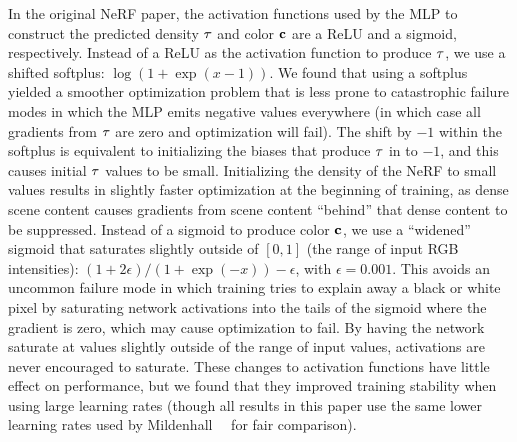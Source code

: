 \documentclass[10pt,twocolumn,letterpaper]{article}
\begin{document}
In the original NeRF paper, the activation functions used by the MLP to construct the predicted density $\tau$ and color $\mathbf{c}$ are a ReLU and a sigmoid, respectively. Instead of a ReLU as the activation function to produce $\tau$, we use a shifted softplus: $\log(1+\exp(x - 1))$. We found that using a softplus yielded a smoother optimization problem that is less prone to catastrophic failure modes in which the MLP emits negative values everywhere (in which case all gradients from $\tau$ are zero and optimization will fail). The shift by $-1$ within the softplus is equivalent to initializing the biases that produce $\tau$ in \shortmodelnamelower to $-1$, and this causes initial $\tau$ values to be small. Initializing the density of the NeRF to small values results in slightly faster optimization at the beginning of training, as dense scene content causes gradients from scene content ``behind'' that dense content to be suppressed.
Instead of a sigmoid to produce color $\mathbf{c}$, we use a ``widened'' sigmoid that saturates slightly outside of $[0, 1]$ (the range of input RGB intensities): $(1 + 2\epsilon) / (1+\exp(-x)) - \epsilon$, with $\epsilon=0.001$. This avoids an uncommon failure mode in which training tries to explain away a black or white pixel by saturating network activations into the tails of the sigmoid where the gradient is zero, which may cause optimization to fail. By having the network saturate at values slightly outside of the range of input values, activations are never encouraged to saturate.
These changes to activation functions have little effect on performance, but we found that they improved training stability when using large learning rates (though all results in this paper use the same lower learning rates used by Mildenhall~\etal~\cite{mildenhall2020} for fair comparison).
\end{document}
